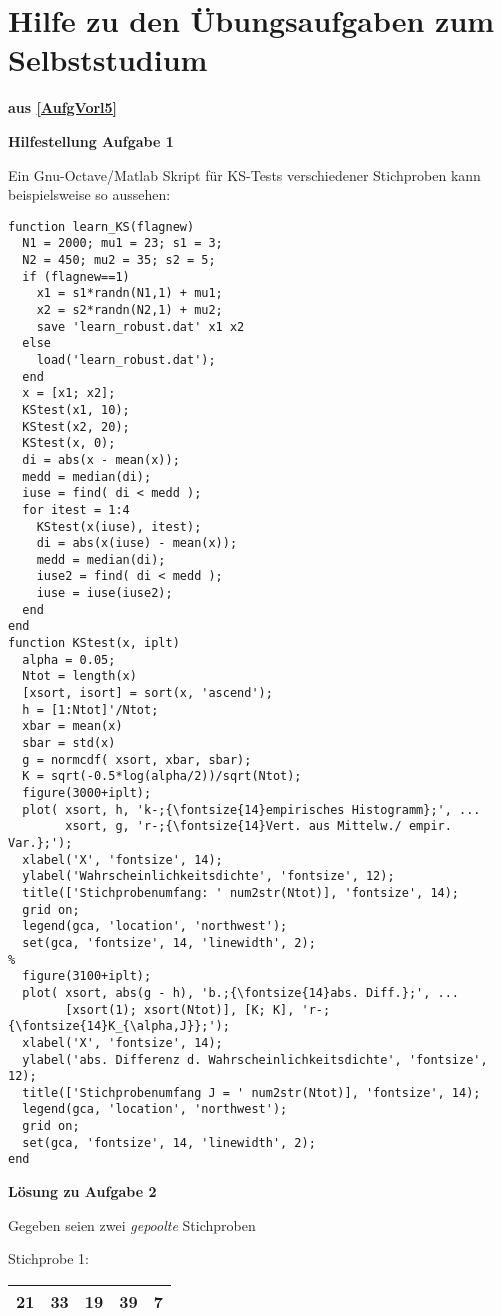 \section{Hilfe zu den Übungsaufgaben zum Selbststudium}
\textbf{aus \ref{AufgVorl5}}

\textbf{\large Hilfestellung Aufgabe 1}

Ein Gnu-Octave/Matlab Skript für KS-Tests verschiedener Stichproben
kann beispielsweise so aussehen:
\begin{verbatim}
function learn_KS(flagnew)
  N1 = 2000; mu1 = 23; s1 = 3;
  N2 = 450; mu2 = 35; s2 = 5;
  if (flagnew==1)
    x1 = s1*randn(N1,1) + mu1;
    x2 = s2*randn(N2,1) + mu2;
    save 'learn_robust.dat' x1 x2
  else
    load('learn_robust.dat');
  end
  x = [x1; x2];
  KStest(x1, 10);
  KStest(x2, 20);
  KStest(x, 0);
  di = abs(x - mean(x));
  medd = median(di);
  iuse = find( di < medd );
  for itest = 1:4
    KStest(x(iuse), itest);
    di = abs(x(iuse) - mean(x));
    medd = median(di);
    iuse2 = find( di < medd );
    iuse = iuse(iuse2);
  end
end
function KStest(x, iplt)
  alpha = 0.05;
  Ntot = length(x)
  [xsort, isort] = sort(x, 'ascend');
  h = [1:Ntot]'/Ntot;
  xbar = mean(x)
  sbar = std(x)
  g = normcdf( xsort, xbar, sbar);
  K = sqrt(-0.5*log(alpha/2))/sqrt(Ntot);
  figure(3000+iplt);
  plot( xsort, h, 'k-;{\fontsize{14}empirisches Histogramm};', ...
        xsort, g, 'r-;{\fontsize{14}Vert. aus Mittelw./ empir. Var.};');
  xlabel('X', 'fontsize', 14);
  ylabel('Wahrscheinlichkeitsdichte', 'fontsize', 12);
  title(['Stichprobenumfang: ' num2str(Ntot)], 'fontsize', 14);
  grid on;
  legend(gca, 'location', 'northwest');
  set(gca, 'fontsize', 14, 'linewidth', 2);
%
  figure(3100+iplt);
  plot( xsort, abs(g - h), 'b.;{\fontsize{14}abs. Diff.};', ...
        [xsort(1); xsort(Ntot)], [K; K], 'r-;{\fontsize{14}K_{\alpha,J}};');
  xlabel('X', 'fontsize', 14);
  ylabel('abs. Differenz d. Wahrscheinlichkeitsdichte', 'fontsize', 12);
  title(['Stichprobenumfang J = ' num2str(Ntot)], 'fontsize', 14);
  legend(gca, 'location', 'northwest');
  grid on;
  set(gca, 'fontsize', 14, 'linewidth', 2);
end
\end{verbatim}

\textbf{\large Lösung zu Aufgabe 2}

Gegeben seien zwei \textsl{gepoolte} Stichproben

Stichprobe 1:

\begin{tabular}{|c|c|c|c|c|}
\hline
21 & 33 & 19 & 39 & 7\\
\hline
\end{tabular}

